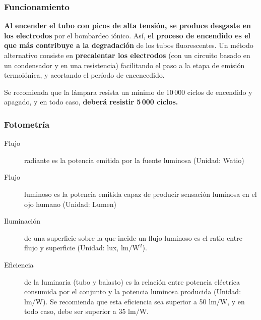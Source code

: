 \documentclass[serif, xcolor=dvipsnames]{beamer}
\begin{document}
\begin{frame}
\frametitle{Funcionamiento}

\textbf{Al encender el tubo con picos de alta tensión, se produce
desgaste en los electrodos} por el bombardeo iónico. Así, \textbf{el
proceso de encendido es el que más contribuye a la degradación} de
los tubos fluorescentes. Un método alternativo consiste en \textbf{precalentar
los electrodos} (con un circuito basado en un condensador y en una
resistencia) facilitando el paso a la etapa de emisión termoiónica,
y acortando el período de encencedido.

Se recomienda que la lámpara resista un mínimo de 10\,000 ciclos
de encendido y apagado, y en todo caso, \textbf{deberá resistir 5\,000
ciclos.}


\end{frame}

\begin{frame}
\frametitle{Fotometría}
\begin{description}
\item [{Flujo}] radiante es la potencia emitida por la fuente luminosa
(Unidad: Watio)
\item [{Flujo}] luminoso es la potencia emitida capaz de producir sensación
luminosa en el ojo humano (Unidad: Lumen)
\item [{Iluminación}] de una superficie sobre la que incide un flujo luminoso
es el ratio entre flujo y superficie (Unidad: lux, $\si{\lumen\per\watt\squared}$).
\item [{Eficiencia}] de la luminaria (tubo y balasto) es la relación entre
potencia eléctrica consumida por el conjunto y la potencia luminosa
producida (Unidad: $\si{\lumen\per\watt}$). Se recomienda que esta eficiencia
sea superior a 50 $\si{\lumen\per\watt}$, y en todo caso, debe ser superior a 35 $\si{\lumen\per\watt}$.
\end{description}

\end{frame}
\end{document}
